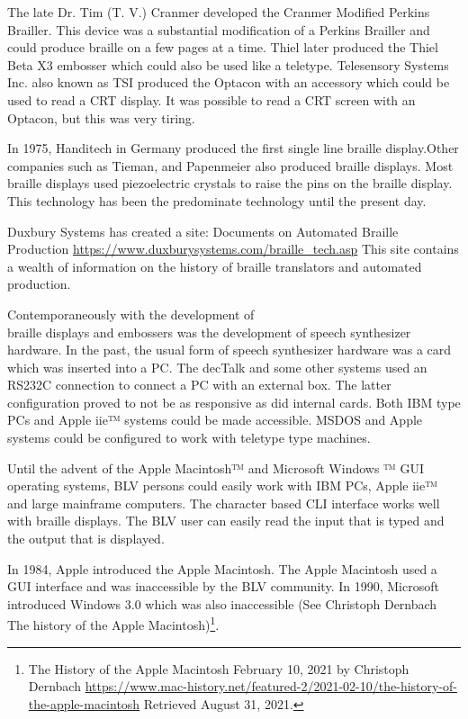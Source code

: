 \documentclass[11.5pt]{sig-alternate}
\begin{document}
\begin{large}
The late Dr. Tim (T. V.) Cranmer developed the Cranmer Modified Perkins Brailler. This device was a substantial modification of a Perkins Brailler and could produce braille on a few pages at a time. Thiel later produced the Thiel Beta X3 embosser which could also be used like a teletype. Telesensory Systems Inc. also known as TSI produced the Optacon with an accessory which could be used to read a CRT display. It was possible to read a CRT screen with an Optacon, but this was very tiring.

In 1975, Handitech in Germany produced the first single line braille display.Other companies such as Tieman, and Papenmeier also produced braille displays. Most braille displays used piezoelectric crystals to raise the pins on the braille display. This technology has been the predominate technology until the present day.

Duxbury Systems has created a site: Documents on Automated Braille Production \url{https://www.duxburysystems.com/braille\_tech.asp} This site contains a wealth of information on the history of braille translators and automated production.

Contemporaneously with the development of \\braille displays and embossers was the development of speech synthesizer hardware. In the past, the usual form of speech synthesizer hardware was a card which was inserted into a PC. The decTalk and some other systems used an RS232C connection to connect a PC with an external box. The latter configuration proved to not be as responsive as did internal cards. Both IBM type PCs and Apple iie™ systems could be made accessible. MSDOS and Apple systems could be configured to work with teletype type machines.

Until the advent of the Apple Macintosh™ and Microsoft Windows ™ GUI operating systems, BLV persons could easily work with IBM PCs, Apple iie™ and large mainframe computers. The character based CLI interface works well with braille displays. The BLV user can easily read the input that is typed and the output that is displayed.

In 1984, Apple introduced the Apple Macintosh. The Apple Macintosh used a GUI interface and was inaccessible by the BLV community. In 1990, Microsoft introduced Windows 3.0 which was also inaccessible (See Christoph Dernbach The history of the Apple Macintosh)\footnote{The History of the Apple Macintosh February 10, 2021 by Christoph Dernbach \url{https://www.mac-history.net/featured-2/2021-02-10/the-history-of-the-apple-macintosh} Retrieved August 31, 2021.
}. 


\end{large}
\end{document}

